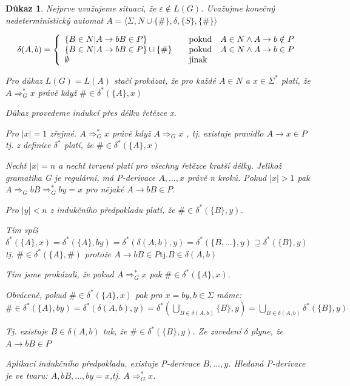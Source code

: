\documentclass[10pt, a4paper, titlepage]{article}
\theoremstyle{note}
\newtheorem{dukaz}{\textbf{Důkaz}}
\begin{document}
\begin{dukaz}
Nejprve uvažujeme situaci, že $ \varepsilon \notin L(G) $. Uvažujme konečný nedeterministický automat $A = \langle \Sigma,N \cup \lbrace \# \rbrace, \delta, \lbrace S \rbrace,\lbrace\#\rbrace \rangle $

$$
\delta(A,b)=\left\{
\begin{array}{l@{\quad\mbox{}\quad}l}
\lbrace B \in N | A \rightarrow bB \in P \rbrace & \text{pokud}\quad A \in N \wedge A \rightarrow b \notin P\\
\lbrace B \in N | A \rightarrow bB \in P \rbrace \cup \lbrace \# \rbrace & \text{pokud}\quad A \in N \wedge A \rightarrow b \in P\\
\emptyset & \text{jinak}\\
\end{array}
\right.
$$

Pro důkaz $L(G)=L(A)$ stačí prokázat, že pro každé $A \in N $  a $ x \in \Sigma^* $ platí, že $A \Rightarrow_G^* x$ právě když $ \# \in \delta^* (\lbrace A \rbrace,x)$

Důkaz provedeme indukcí přes délku řetězce x. 

Pro $|x|=1$ zřejmé. $ A \Rightarrow_G^* x $ právě když $ A \Rightarrow_G x $ , tj. existuje pravidlo $ A \rightarrow x \in P $ tj. z definice $\delta^*$ platí, že $ \#\in \delta^* (\lbrace A \rbrace, x) $

Nechť $|x|=n$ a nechť tvrzení platí pro všechny řetězce kratší délky. Jelikož gramatika G je regulární, má P-derivace $A,\ldots,x$ právě n kroků. Pokud $|x|>1$ pak $ A \Rightarrow_G bB \Rightarrow_G^* by = x $ pro nějaké $ A \rightarrow bB \in P$.

Pro $|y|<n$ z indukčního předpokladu platí, že $\#\in \delta^* (\lbrace B \rbrace,y)$.

Tím spíš $\delta^* ( \lbrace A \rbrace, x ) = \delta^* ( \lbrace A \rbrace, by ) = \delta^* ( \delta( A , b ),y) = \delta^* ( \lbrace B,\ldots \rbrace, y ) \supseteq \delta^* ( \lbrace B \rbrace, y )$ tj. $ \# \in \delta^* (\lbrace A \rbrace,\#)$ protože $ A \rightarrow bB \in P \text{tj.} B\in\delta (A,b)$

Tím jsme prokázali, že pokud $ A \Rightarrow^*_G x$ pak $ \# \in \delta^* ( \lbrace A \rbrace , x )$.

Obráceně, pokud $ \#\in \delta^* ( \lbrace A \rbrace , x )$ pak pro $x=by, b\in \Sigma$ máme: $ \#\in \delta^* ( \lbrace A \rbrace , by ) = \delta^* ( \delta (A,b), y ) = \delta^* (\bigcup_{B\in\delta(A,b)}{\lbrace B \rbrace}, y) = \bigcup_{B\in\delta(A,b)}{\delta^* ( \lbrace B \rbrace , y)}$

Tj. existuje $ B \in \delta (A,b) $ tak, že $ \#\in\delta^* ( \lbrace B \rbrace ,y)$. Ze zavedení $\delta$ plyne, že $A \rightarrow bB \in P$

Aplikací indukčního předpokladu, existuje P-derivace $B,\ldots,y$. Hledaná P-derivace je ve tvaru: $A,bB,\ldots,by=x$,tj. $A \Rightarrow^*_Gx$.
\end{dukaz}
\end{document}
